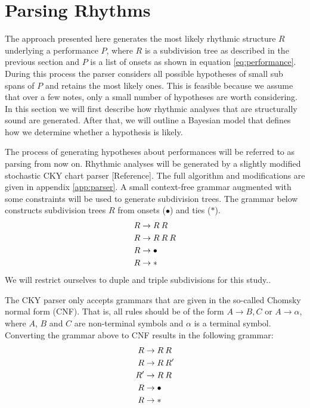 \section{Parsing Rhythms}

The approach presented here generates the most likely rhythmic structure $R$ underlying a performance $P$, where $R$ is a subdivision tree as described in the previous section and $P$ is a list of onsets as shown in equation \ref{eq:performance}. During this process the parser considers all possible hypotheses of small sub spans of $P$ and retains the most likely ones. This is feasible because we assume that over a few notes, only a small number of hypotheses are worth considering. In this section we will first describe how rhythmic analyses that are structurally sound are generated. After that, we will outline a Bayesian model that defines how we determine whether a hypothesis is likely.

The process of generating hypotheses about performances will be referred to as parsing from now on. Rhythmic analyses will be generated by a slightly modified stochastic CKY chart parser [Reference]. The full algorithm and modifications are given in appendix \ref{app:parser}. A small context-free grammar augmented with some constraints will be used to generate subdivision trees. The grammar below constructs subdivision trees $R$ from onsets ($\bullet$) and ties ($*$).
\begin{align}
R &\rightarrow R\: R\\ \notag
R &\rightarrow R\: R\: R\\ \notag
R &\rightarrow \bullet\\ \notag
R &\rightarrow * \notag
\end{align}
We will restrict ourselves to duple and triple subdivisions for this study..

The CKY parser only accepts grammars that are given in the so-called Chomsky normal form (CNF). That is, all rules should be of the form $A \rightarrow B, C$ or $A \rightarrow \alpha$, where $A$, $B$ and $C$ are non-terminal symbols and $\alpha$ is a terminal symbol. Converting the grammar above to CNF results in the following grammar:
\begin{align}
\label{eq:grammar_cnf}
R &\rightarrow R\: R\\ \notag
R &\rightarrow R\: R'\\ \notag
R' &\rightarrow R\: R\\ \notag
R &\rightarrow \bullet\\ \notag
R &\rightarrow * \notag
\end{align}

